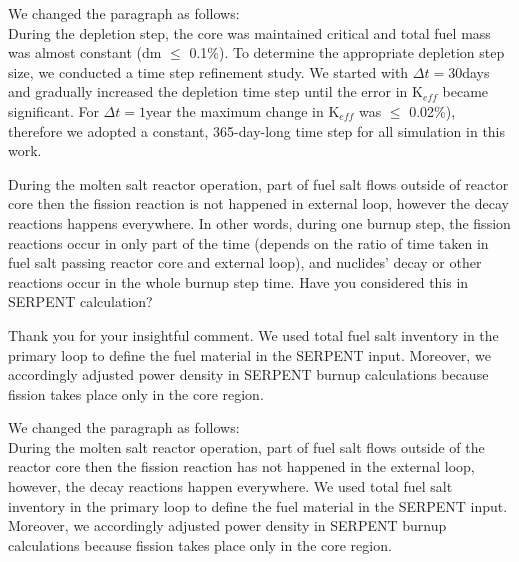 \documentclass[answers,11pt]{exam}
\begin{document}
\begin{questions}
\begin{solution}
        		  We changed the paragraph as follows:\\
        		  During the depletion step, the core was maintained critical and total fuel mass was almost constant (dm $\leq$ 0.1\%). To determine the appropriate depletion step size, we conducted a time step refinement study. We started with $\Delta t=30$days and gradually increased the depletion time step until the error in K$_{eff}$ became significant. For $\Delta t=1$year the maximum change in K$_{eff}$ was $\leq$ 0.02\%), therefore we adopted a constant, 365-day-long time step for all simulation in this work.
        		    
        \end{solution}

        \question During the molten salt reactor operation, part of fuel salt flows outside of reactor core then the fission reaction is not happened in external loop, however the decay reactions happens everywhere. In other words, during one burnup step, the fission reactions occur in only part of the time (depends on the ratio of time taken in fuel salt passing reactor core and external loop), and nuclides' decay or other reactions occur in the whole burnup step time. Have you considered this in SERPENT calculation?  
        \begin{solution}
		          
		          Thank you for your insightful comment. We used total fuel salt inventory in the primary loop to define the fuel material in the SERPENT input. Moreover, we accordingly adjusted power density in SERPENT burnup calculations because fission takes place only in the core region.
		          
		          We changed the paragraph as follows:\\    
		          During the molten salt reactor operation, part of fuel salt flows outside of the reactor core then the fission reaction has not happened in the external loop, however, the decay reactions happen everywhere. We used total fuel salt inventory in the primary loop to define the fuel material in the SERPENT input. Moreover, we accordingly adjusted power density in SERPENT burnup calculations because fission takes place only in the core region.     
        \end{solution}

	

\end{questions}
\end{document}
